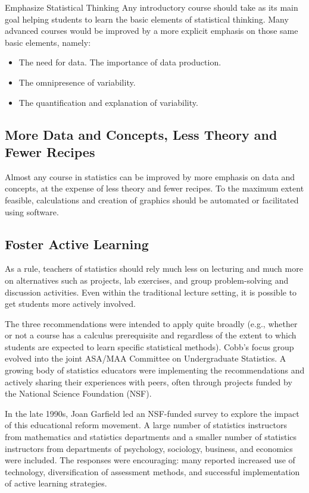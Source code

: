 Emphasize Statistical Thinking
Any introductory course should take as its main goal helping students to learn the basic elements of statistical thinking. Many advanced courses would be improved by a more explicit emphasis on those same basic elements, namely:
\begin{itemize}
\item The need for data. The importance of data production. 
\item The omnipresence of variability. 
\item The quantification and explanation of variability. 
\end{itemize}

\subsection{More Data and Concepts, Less Theory and Fewer Recipes}

Almost any course in statistics can be improved by more emphasis on data and concepts, at the expense of less theory and fewer recipes.  To the maximum extent feasible, calculations and creation of graphics should be automated or facilitated using software.

\subsection{Foster Active Learning}
As a rule, teachers of statistics should rely much less on lecturing and much more on alternatives such as projects, lab exercises, and group problem-solving and discussion activities. Even within the traditional lecture setting, it is possible to get students more actively involved.

The three recommendations were intended to apply quite broadly (e.g., whether or not a course has a calculus prerequisite and regardless of the extent to which students are expected to learn specific statistical methods). Cobb’s focus group evolved into the joint ASA/MAA Committee on Undergraduate Statistics.  A growing body of statistics educators were implementing the recommendations and actively sharing their experiences with peers, often through projects funded by the National Science Foundation (NSF).

In the late 1990s, Joan Garfield led an NSF-funded survey  to explore the impact of this educational reform movement.  A large number of statistics instructors from mathematics and statistics departments and a smaller number of statistics instructors from departments of psychology, sociology, business, and economics were included. The responses were encouraging: many reported increased use of technology, diversification of assessment methods, and successful implementation of active learning strategies.

